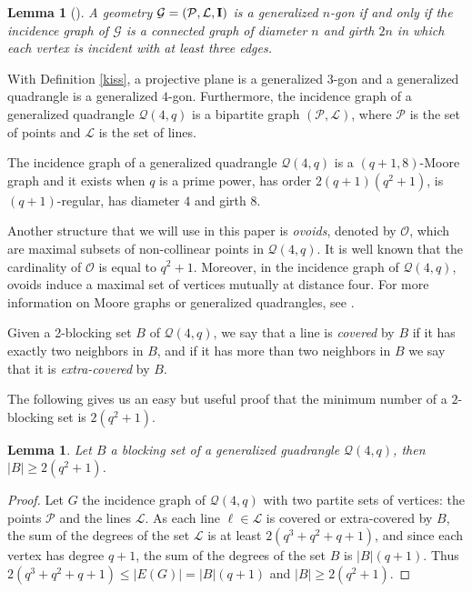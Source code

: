 \documentclass[12pt]{article}
\newtheorem{lemma}[theorem]{Lemma}
\begin{document}
\begin{lemma}[\cite{VM98}]\label{VMLemma}
A geometry ${\mathcal G} = (\cal{P},\cal{L},{\bf I})$ is a generalized $n$-gon if and
only if the incidence graph of ${\mathcal G}$ is a connected graph of diameter $n$ and
girth $2n$ in which each vertex is incident with at least three edges.
\end{lemma}

With Definition \ref{kiss}, a projective plane is a generalized $3$-gon and a generalized quadrangle is a generalized $4$-gon. Furthermore, the incidence graph of a generalized quadrangle $\mathcal{Q}(4,q)$ is a bipartite graph $(\mathcal{P},\mathcal{L})$, where $\mathcal{P}$ is the set of points and $\mathcal{L}$ is the set of lines. 

The incidence graph of a generalized quadrangle $\mathcal{Q}(4,q)$ is a $(q+1,8)$-Moore graph and it exists when $q$ is a prime power, has order  $2(q+1)(q^2+1)$, is $(q+1)$-regular, has diameter $4$ and girth $8$. 

Another structure that we will use in this paper is {\emph{ovoids}}, denoted by $\mathcal{O}$, which are maximal subsets of non-collinear points in $\mathcal{Q}(4,q)$. It is well known that the cardinality of $\mathcal{O}$ is equal to $q^2+1$. Moreover, in the incidence graph of $\mathcal{Q}(4,q)$, ovoids induce a maximal set of vertices mutually at distance four. 
For more information on Moore graphs or generalized quadrangles, see \cite{EJ13,KS20,LibroRojo,VM98}.

Given a 2-blocking set $B$ of $\mathcal{Q}(4,q)$, we say that a line is \emph{covered} by $B$ if it has exactly two neighbors in $B$, and if it has more than two neighbors in $B$  we say that it is \emph{extra-covered} by $B$. 

The following gives us an easy but useful proof that the minimum number of a $2$-blocking set is $2(q^2+1)$.

\begin{lemma} \label{blockingset} Let $B$ a blocking set of a generalized guadrangle $\mathcal{Q}(4,q)$, then $|B|\geq 2(q^2+1)$.
\end{lemma}

\begin{proof} Let $G$ the incidence graph of $\mathcal{Q}(4,q)$  with two partite sets of vertices: the points $\mathcal{P}$ and the lines $\mathcal{L}$. As each line $\ell\in\mathcal{L}$ is covered or extra-covered by $B$, the sum of the degrees of the set $\mathcal{L}$ is at least $2(q^3+q^2+q+1)$, and since each vertex has degree $q+1$, the sum of the degrees of the set $B$ is $|B|(q+1)$. Thus $2(q^3+q^2+q+1)\le |E(G)|=|B|(q+1)$ and $|B|\ge 2(q^2+1)$.
\end{proof}
\end{document}
